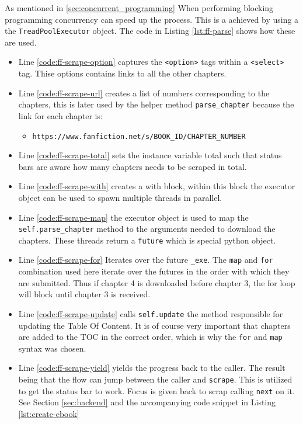 \documentclass[]{report}   %
\begin{document}
As mentioned in \ref{sec:concurrent_programming} When performing blocking
programming concurrency can speed up the process. This is a achieved by using a
the \texttt{TreadPoolExecutor} object. The code in Listing \ref{lst:ff-parse} shows how these are used.
\begin{itemize}
	\item Line \ref{code:ff-scrape-option} captures the \texttt{<option>} tags within a \texttt{<select>} tag. Thise options contains links to all the other chapters.
	\item Line \ref{code:ff-scrape-url} creates a list of numbers corresponding to the chapters, this is later used by the helper method \texttt{parse\_chapter} because the link for each chapter is:
		\begin{itemize}
			\item \texttt{https://www.fanfiction.net/s/BOOK\_ID/CHAPTER\_NUMBER}
		\end{itemize}
	\item Line \ref{code:ff-scrape-total} sets the instance variable total such that status bars are aware how many chapters needs to be scraped in total.
	\item Line \ref{code:ff-scrape-with} creates a with block, within this
		block the executor object can be used to spawn multiple threads in
		parallel. 
	\item Line \ref{code:ff-scrape-map} the executor object is used to map the
		\texttt{self.parse\_chapter} method to the arguments needed to download
		the chapters. These threads return a \texttt{future} which is
		special python object. 
	\item Line \ref{code:ff-scrape-for} Iterates over the future
		\texttt{\_exe}. The \texttt{map} and \texttt{for} combination used here
		iterate over the futures in the order with which they are submitted.
		Thus if chapter 4 is downloaded before chapter 3, the for loop will
		block until chapter 3 is received. 
	\item Line \ref{code:ff-scrape-update} calls \texttt{self.update} the
		method responsible for updating the Table Of Content. It is of course
		very important that chapters are added to the TOC in the correct order,
		which is why the \texttt{for} and \texttt{map} syntax was chosen.
	\item Line \ref{code:ff-scrape-yield} yields the progress back to the
		caller. The result being that the flow can jump between the caller and
		\texttt{scrape}.  This is utilized to get the status bar to work. Focus
		is given back to scrap calling \texttt{next} on it. See Section
		\ref{sec:backend} and the accompanying code snippet in Listing
		\ref{lst:create-ebook} 
\end{itemize}
\end{document}
